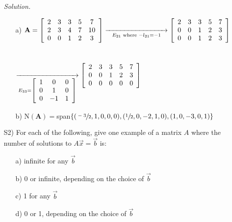 \documentclass[12pt]{article}
\begin{document}
\begin{itemize}
\textit{Solution.}
\begin{itemize}
\item[a)] $\mathbf{A}=
\left[\begin{array}{ccccc} 
2 & 3 & 3 & 5 & 7 \\ 
2 & 3 & 4 & 7 & 10\\
0 & 0 & 1 & 2 & 3
\end{array}\right]
\underset{E_{21} \text{ where } -l_{21}=-1}{\xrightarrow{\hspace{30mm}}}
\left[\begin{array}{ccccc} 
2 & 3 & 3 & 5 & 7 \\ 
0 & 0 & 1 & 2 & 3 \\
0 & 0 & 1 & 2 & 3
\end{array}\right]$\\\\\\$
\underset{E_{33}=
\left[\begin{array}{ccc} 
1 & 0 & 0 \\ 
0 & 1 & 0 \\
0 & -1 & 1 
\end{array}\right]}{\xrightarrow{\hspace{30mm}}}
\left[\begin{array}{ccccc} 
2 & 3 & 3 & 5 & 7 \\ 
0 & 0 & 1 & 2 & 3 \\
0 & 0 & 0 & 0 & 0
\end{array}\right]$
\item[b)] N$(\mathbf{A})=$span$\{(\sfrac{-3}{2},1,0,0,0),(\sfrac{1}{2},0,-2,1,0),(1,0,-3,0,1)\}$
\end{itemize}

\item[S2)] For each of the following, give one example of a matrix $A$ where the number of solutions to $A\vec{x}=\vec{b}$ is:
\begin{itemize}
\item[a)] infinite for any $\vec{b}$
\item[b)] 0 or infinite, depending on the choice of $\vec{b}$
\item[c)] 1 for any $\vec{b}$
\item[d)] 0 or 1, depending on the choice of $\vec{b}$
\end{itemize}


\end{itemize}
\end{document}

